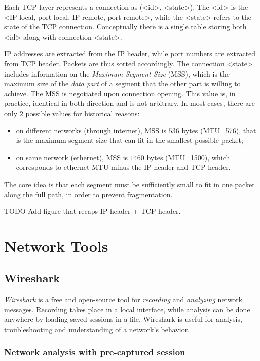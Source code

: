 \documentclass[a4paper, 12pt]{report}
\begin{document}
Each TCP layer represents a connection as (<id>, <state>). The <id> is the
<IP-local, port-local, IP-remote, port-remote>, while the <state> refers to the
state of the TCP connection. Conceptually there is a single table storing both
<id> along with connection <state>.

IP addresses are extracted from the IP header, while port numbers are extracted
from TCP header. Packets are thus sorted accordingly. The connection <state>
includes information on the \emph{Maximum Segment Size} (MSS), which is the
maximum size of the \emph{data part} of a segment that the other part is
willing to achieve. The MSS is negotiated upon connection opening. This value
is, in practice, identical in both direction and is not arbitrary. In most
cases, there are only $2$ possible values for historical reasons:

\begin{itemize}
	\item on different networks (through internet), MSS is $536$ bytes (MTU=576),
		that is the maximum segment size that can fit in the smallest
		possible packet;
	\item on same network (ethernet), MSS is $1460$ bytes (MTU=1500), which
		corresponds to ethernet MTU minus the IP header and TCP header.
\end{itemize}

The core idea is that each segment must be sufficiently small to fit in one
packet along the full path, in order to prevent fragmentation.

TODO Add figure that recaps IP header + TCP header.

\part{Network Tools}

\chapter{Wireshark}

\emph{Wireshark} is a free and open-source tool for \emph{recording} and
\emph{analyzing} network messages. Recording takes place in a local interface,
while analysis can be done anywhere by loading saved sessions in a file.
Wireshark is useful for analysis, troubleshooting and understanding of a
network's behavior.

\section{Network analysis with pre-captured session}
\end{document}
